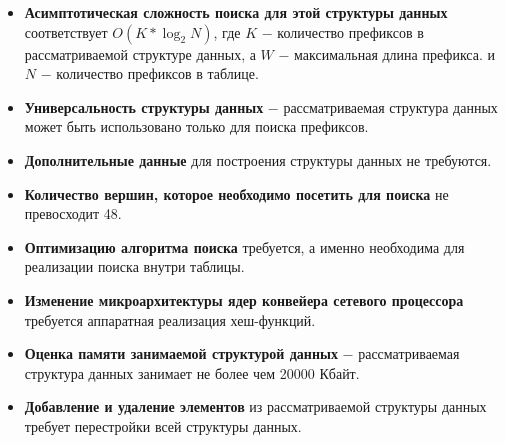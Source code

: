 \documentclass[a4paper, 12pt, titlepage, finall]{extreport}
\begin{document}
            \begin{itemize}
                \item\textbf{Асимптотическая сложность поиска для этой структуры данных} соответствует {\ttfamily $O(K*\log_2{N})$},
                где {\ttfamily $K$} $-$ количество префиксов в рассматриваемой структуре данных, а {\ttfamily $W$} $-$ максимальная длина префикса.
                и {\ttfamily $N$} $-$ количество префиксов в таблице.
                \item\textbf{Универсальность структуры данных} $-$ рассматриваемая структура данных может быть использовано только для поиска префиксов.
                \item\textbf{Дополнительные данные} для построения структуры данных не требуются.
                \item\textbf{Количество вершин, которое необходимо посетить для поиска} не превосходит 48.
                \item\textbf{Оптимизацию алгоритма поиска} требуется, а именно необходима для реализации поиска внутри таблицы.
                \item\textbf{Изменение микроархитектуры ядер конвейера сетевого процессора} требуется аппаратная реализация хеш-функций.
                \item\textbf{Оценка памяти занимаемой структурой данных} $-$ рассматриваемая структура данных занимает не более чем 20000 Кбайт.
                \item\textbf{Добавление и удаление элементов} из рассматриваемой структуры данных требует перестройки всей структуры данных.
            \end{itemize}
\end{document}

